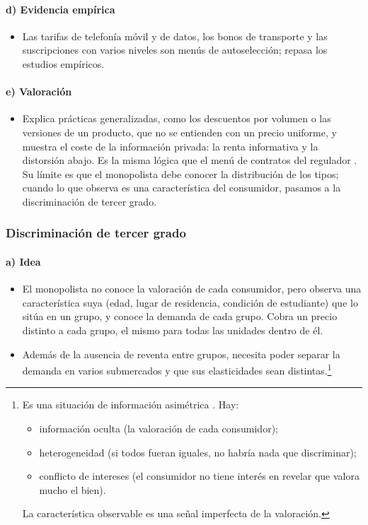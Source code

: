 \documentclass[11pt]{article}
\begin{document}
\paragraph{d) Evidencia empírica}

\begin{itemize}
\item Las tarifas de telefonía móvil y de datos, los bonos de transporte y las suscripciones con varios niveles son menús de autoselección; \textcite{Varian1989Price} repasa los estudios empíricos.
\end{itemize}

\paragraph{e) Valoración}

\begin{itemize}
\item Explica prácticas generalizadas, como los descuentos por volumen o las versiones de un producto, que no se entienden con un precio uniforme, y muestra el coste de la información privada: la renta informativa y la distorsión abajo. Es la misma lógica que el menú de contratos del regulador . Su límite es que el monopolista debe conocer la distribución de los tipos; cuando lo que observa es una característica del consumidor, pasamos a la discriminación de tercer grado.
\end{itemize}

\subsubsection{Discriminación de tercer grado}\label{sec:discriminacion-tercer-grado}

\paragraph{a) Idea}

\begin{itemize}
\item El monopolista no conoce la valoración de cada consumidor, pero observa una característica suya (edad, lugar de residencia, condición de estudiante) que lo sitúa en un grupo, y conoce la demanda de cada grupo. Cobra un precio distinto a cada grupo, el mismo para todas las unidades dentro de él.
\item Además de la ausencia de reventa entre grupos, necesita poder separar la demanda en varios submercados y que sus elasticidades sean distintas.\footnote{Es una situación de información asimétrica . Hay:
\begin{itemize}
\item información oculta (la valoración de cada consumidor);
\item heterogeneidad (si todos fueran iguales, no habría nada que discriminar);
\item conflicto de intereses (el consumidor no tiene interés en revelar que valora mucho el bien).
\end{itemize}
La característica observable es una señal imperfecta de la valoración.}
\end{itemize}
\end{document}
